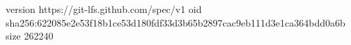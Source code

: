 version https://git-lfs.github.com/spec/v1
oid sha256:622085e2e53f18b1ce53d180fdf33d3b65b2897cac9eb111d3e1ca364bdd0a6b
size 262240
